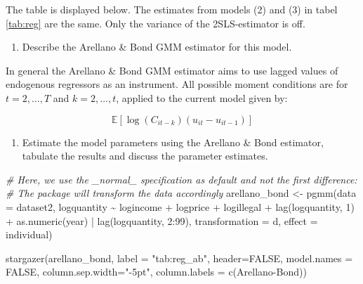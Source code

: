 \documentclass[
]{article}
\newenvironment{Shaded}{\begin{snugshade}}{\end{snugshade}}
\newcommand{\AttributeTok}[1]{\textcolor[rgb]{0.77,0.63,0.00}{#1}}
\newcommand{\CommentTok}[1]{\textcolor[rgb]{0.56,0.35,0.01}{\textit{#1}}}
\newcommand{\ConstantTok}[1]{\textcolor[rgb]{0.00,0.00,0.00}{#1}}
\newcommand{\DecValTok}[1]{\textcolor[rgb]{0.00,0.00,0.81}{#1}}
\newcommand{\FunctionTok}[1]{\textcolor[rgb]{0.00,0.00,0.00}{#1}}
\newcommand{\NormalTok}[1]{#1}
\newcommand{\OtherTok}[1]{\textcolor[rgb]{0.56,0.35,0.01}{#1}}
\newcommand{\SpecialCharTok}[1]{\textcolor[rgb]{0.00,0.00,0.00}{#1}}
\newcommand{\StringTok}[1]{\textcolor[rgb]{0.31,0.60,0.02}{#1}}
\providecommand{\tightlist}{%
  \setlength{\itemsep}{0pt}\setlength{\parskip}{0pt}}
\let\oldShaded\Shaded
\let\endoldShaded\endShaded
\renewenvironment{Shaded}{\footnotesize\oldShaded}{\endoldShaded}
\begin{document}
The table is displayed below. The estimates from models (2) and (3) in
tabel \ref{tab:reg} are the same. Only the variance of the
2SLS-estimator is off.

\begin{enumerate}
\def\labelenumi{\arabic{enumi}.}
\setcounter{enumi}{3}
\tightlist
\item
  Describe the Arellano \& Bond GMM estimator for this model.
\end{enumerate}

In general the Arellano \& Bond GMM estimator aims to use lagged values
of endogenous regressors as an instrument. All possible moment
conditions are for \(t=2,\dots,T\) and \(k=2,\dots,t\), applied to the
current model given by:

\begin{equation*}
\mathbb{E}[\log(C_{it-k})(u_{it}-u_{it-1})]
\end{equation*}

\begin{enumerate}
\def\labelenumi{\arabic{enumi}.}
\setcounter{enumi}{4}
\tightlist
\item
  Estimate the model parameters using the Arellano \& Bond estimator,
  tabulate the results and discuss the parameter estimates.
\end{enumerate}

\begin{Shaded}
\begin{Highlighting}[]
\CommentTok{\# Here, we use the \_normal\_ specification as default and not the first difference:}
\CommentTok{\# The package will transform the data accordingly}
\NormalTok{arellano\_bond }\OtherTok{\textless{}{-}} \FunctionTok{pgmm}\NormalTok{(}\AttributeTok{data =}\NormalTok{ dataset2,}
\NormalTok{                          logquantity }\SpecialCharTok{\textasciitilde{}}\NormalTok{ logincome }\SpecialCharTok{+}\NormalTok{ logprice }\SpecialCharTok{+} 
\NormalTok{                            logillegal }\SpecialCharTok{+} \FunctionTok{lag}\NormalTok{(logquantity, }\DecValTok{1}\NormalTok{) }\SpecialCharTok{+} \FunctionTok{as.numeric}\NormalTok{(year)}
                          \SpecialCharTok{|} \FunctionTok{lag}\NormalTok{(logquantity, }\DecValTok{2}\SpecialCharTok{:}\DecValTok{99}\NormalTok{), }\AttributeTok{transformation =} \StringTok{\textquotesingle{}d\textquotesingle{}}\NormalTok{, }\AttributeTok{effect =} \StringTok{\textquotesingle{}individual\textquotesingle{}}\NormalTok{)}

\FunctionTok{stargazer}\NormalTok{(arellano\_bond, }\AttributeTok{label =} \StringTok{"tab:reg\_ab"}\NormalTok{, }\AttributeTok{header=}\ConstantTok{FALSE}\NormalTok{, }\AttributeTok{model.names =} \ConstantTok{FALSE}\NormalTok{,}
          \AttributeTok{column.sep.width=}\StringTok{"{-}5pt"}\NormalTok{,}
          \AttributeTok{column.labels =} \FunctionTok{c}\NormalTok{(}\StringTok{\textquotesingle{}Arellano{-}Bond\textquotesingle{}}\NormalTok{))}
\end{Highlighting}
\end{Shaded}
\end{document}
